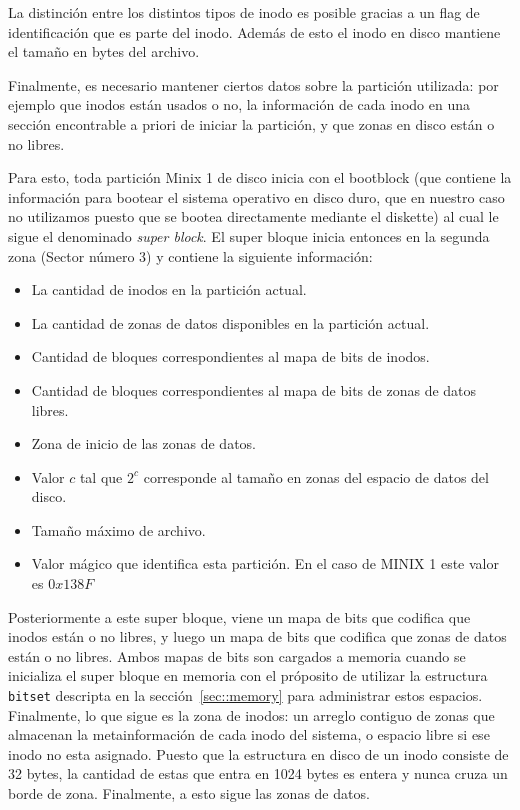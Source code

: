 La distinci\'on entre los distintos tipos de inodo es posible gracias a un flag de identificaci\'on que es parte del inodo. Adem\'as de esto
el inodo en disco mantiene el tama\~no en bytes del archivo.

Finalmente, es necesario mantener ciertos datos sobre la partici\'on utilizada: por ejemplo que inodos est\'an usados o no, la informaci\'on
de cada inodo en una secci\'on encontrable a priori de iniciar la partici\'on, y que zonas en disco est\'an o no libres.

Para esto, toda partici\'on Minix 1 de disco inicia con el bootblock (que contiene la informaci\'on para bootear el sistema operativo en disco
duro, que en nuestro caso no utilizamos puesto que se bootea directamente mediante el diskette) al cual le sigue el denominado \textit{super block}. El super bloque inicia entonces en la segunda zona (Sector n\'umero 3) y contiene la siguiente informaci\'on:

\begin{itemize}
	\item La cantidad de inodos en la partici\'on actual.
	\item La cantidad de zonas de datos disponibles en la partici\'on actual.
	\item Cantidad de bloques correspondientes al mapa de bits de inodos.
	\item Cantidad de bloques correspondientes al mapa de bits de zonas de datos libres.
	\item Zona de inicio de las zonas de datos.
	\item Valor $c$ tal que $2^c$ corresponde al tama\~no en zonas del espacio de datos del disco.
	\item Tama\~no m\'aximo de archivo.
	\item Valor m\'agico que identifica esta partici\'on. En el caso de MINIX 1 este valor es $0x138F$
\end{itemize}

Posteriormente a este super bloque, viene un mapa de bits que codifica que inodos est\'an o no libres, y luego un mapa de bits que codifica
que zonas de datos est\'an o no libres. Ambos mapas de bits son cargados a memoria cuando se inicializa el super bloque en memoria con el
pr\'oposito de utilizar la estructura \texttt{bitset} descripta en la secci\'on~\ref{sec::memory} para administrar estos espacios. Finalmente,
lo que sigue es la zona de inodos: un arreglo contiguo de zonas que almacenan la metainformaci\'on de cada inodo del sistema, o espacio libre
si ese inodo no esta asignado. Puesto que la estructura en disco de un inodo consiste de 32 bytes, la cantidad de estas que entra en 1024 bytes
es entera y nunca cruza un borde de zona. Finalmente, a esto sigue las zonas de datos.

